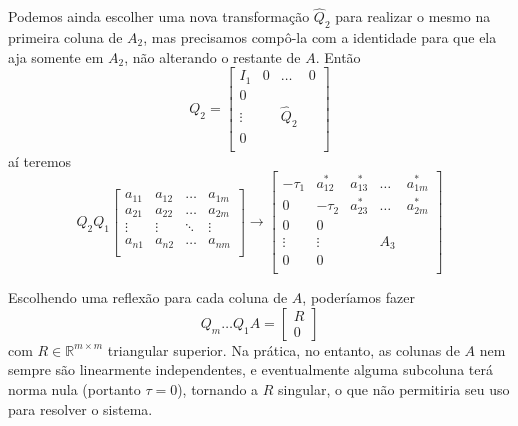 \documentclass[a4paper,11pt]{article}
\begin{document}
        Podemos ainda escolher uma nova transformação $\hat{Q}_2$ para realizar o mesmo na primeira coluna de $A_2$, mas precisamos compô-la com a identidade para que ela aja somente em $A_2$, não alterando o restante de $A$.
        Então
        $$
        Q_2 =
        \left[
        \begin{array}{c|ccc}
            I_1 & 0 & \dots & 0 \\ \hline
            0 & &  & \\
            \vdots & & \hat{Q}_2 & \\
            0 & &  & \\
        \end{array} \right]
        $$
        aí teremos
        $$Q_2Q_1
        \begin{bmatrix}
            a_{11} & a_{12} & \dots & a_{1m} \\
            a_{21} & a_{22} & \dots & a_{2m} \\
            \vdots & \vdots & \ddots & \vdots \\
            a_{n1} & a_{n2} & \dots & a_{nm} \\
        \end{bmatrix}
        \rightarrow
        \left[
        \begin{array}{cc|ccc}
            -\tau_1  & a_{12}^* & a_{13}^* & \dots & a_{1m}^* \\
                  0  & -\tau_2  & a_{23}^* & \dots & a_{2m}^* \\ \hline
                  0  &       0  &          &       &          \\
            \vdots   &  \vdots  &          &  A_3  &          \\
                  0  &       0  &          &       &          \\
        \end{array}\right] $$

        Escolhendo uma reflexão para cada coluna de $A$, poderíamos fazer
        $$ Q_m\dots Q_1A =
        \begin{bmatrix}
            R \\
            0
        \end{bmatrix}
        $$
        com $R \in \mathbb{R}^{m\times m}$ triangular superior.
        Na prática, no entanto, as colunas de $A$ nem sempre são linearmente independentes, e eventualmente alguma subcoluna terá norma nula (portanto $\tau = 0$), tornando a $R$ singular, o que não permitiria seu uso para resolver o sistema.
\end{document}
